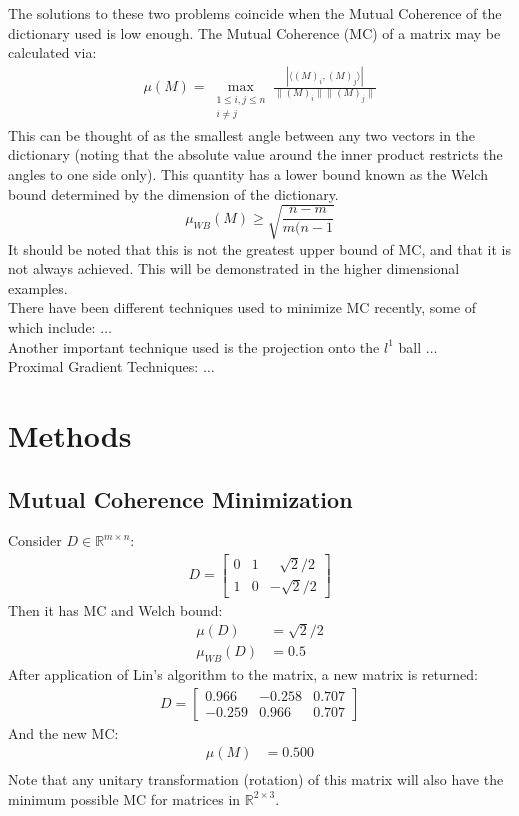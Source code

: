 \documentclass[journal]{IEEEtran}
\begin{document}
The solutions to these two problems coincide when the Mutual Coherence of the dictionary used is low 
enough. The Mutual Coherence (MC) of a matrix may be calculated via:
\begin{align}
\mu(M)=\max\limits_{\substack{1\leq i,j \leq n \\ i\neq j}}\frac{|\langle (M)_i, (M)_j \rangle |}{\|(M)_i\| \|(M)_j\|}
\end{align}
This can be thought of as the smallest angle between any two vectors in the dictionary (noting that
the absolute value around the inner product restricts the angles to one side only). This quantity
has a lower bound known as the Welch bound determined by the dimension of the dictionary.
\begin{equation}
\mu_{WB}(M) \geq \sqrt{\frac{n - m}{m(n-1}}
\end{equation}
It should be noted that this is not the greatest upper bound of MC, and that it is not always
achieved. This will be demonstrated in the higher dimensional examples. \\
There have been different techniques used to minimize MC recently, some of which include: $\ldots$ \\
Another important technique used is the projection onto the $l^1$ ball $\ldots$\\
Proximal Gradient Techniques: $\ldots$
\pagebreak %
\section{Methods}
\subsection{Mutual Coherence Minimization}
Consider $D \in \mathbb{R}^{m\times n}$:
\begin{align}
    D = \begin{bmatrix} 0 &1 &\>\>\>\sqrt{2}/2 \\
                        1 &0 &-\sqrt{2}/2 \end{bmatrix}
\end{align}
Then it has MC and Welch bound:
\begin{align}
\mu (D) &= \sqrt{2}/2 \\
\mu_{WB} (D) &= 0.5
\end{align}
After application of Lin's algorithm to the matrix, a new matrix is returned:
\begin{align}
    D = \left[\begin{array}{ccc} 0.966 & -0.258  &0.707\\ -0.259 & 0.966 & 0.707 \end{array}\right] 
\end{align}
And the new MC:
\begin{align}
\mu (M) &= 0.500 \\[1em]
\end{align}
Note that any unitary transformation (rotation) of this matrix will also have the minimum possible MC for
matrices in $\mathbb{R}^{2 \times 3}$.
\end{document}
